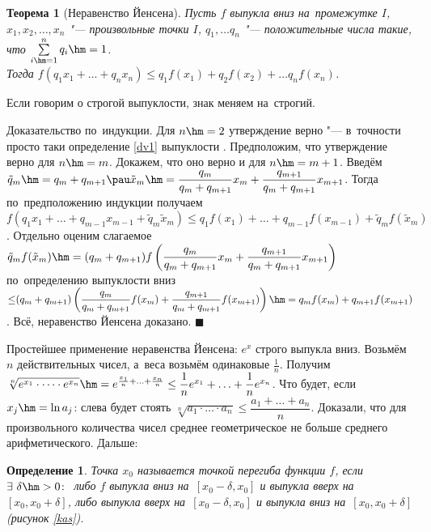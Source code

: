 \documentclass[a4paper,10pt,twoside]{article}
\newtheorem{Def}{Определение}[section]
\newtheorem{The}{Теорема}[section]
\newenvironment{Proof}
       {\par\noindent{\textbf{Доказательство.}}}
       {\hfill$\scriptstyle\blacksquare$}
\begin{document}
\begin{The}[Неравенство Йенсена]
    Пусть $f$ выпукла вниз на~промежутке $I$, $x_1,x_2,\ldots,x_n$ "--- произвольные точки $I$, $q_1,\ldots q_n$ "--- положительные числа такие, что
    $\sum\limits_{i\hm=1}^nq_i\hm=1$. \\Тогда $f(q_1x_1+\ldots+q_nx_n)\leq q_1f(x_1)+q_2f(x_2)+\ldots q_nf(x_n)$.
\end{The}

Если говорим о строгой выпуклости, знак меняем на~строгий.

\begin{Proof}
    Доказательство по~индукции. Для $n\hm=2$ утверждение верно "--- в~точности просто таки определение \ref{dv1} выпуклости . Предположим, что утверждение верно для $n\hm=m$.
    Докажем, что оно верно и для $n\hm=m+1$. Введём $\tilde q_m\hm=q_m+q_{m+1}\pau \tilde x_m\hm=\dfrac{q_m}{q_m+q_{m+1}}x_m+\dfrac{q_{m+1}}{q_m+q_{m+1}}x_{m+1}$.
    Тогда по~предположению индукции получаем $f(q_1x_1+\ldots+q_{m-1}x_{m-1}+\tilde q_m\tilde x_m)\leq q_1f(x_1)+\ldots+q_{m-1}f(x_{m-1})+\tilde q_mf(\tilde x_m)$.
    Отдельно оценим слагаемое $\tilde q_mf(\tilde x_m)\hm=(q_m+q_{m+1})f\left(\dfrac{q_m}{q_m+q_{m+1}}x_m+\dfrac{q_{m+1}}{q_m+q_{m+1}}x_{m+1}\right)$ по~определению
    выпуклости вниз ${\leq} (q_m+q_{m+1})\left(\dfrac{q_m}{q_m+q_{m+1}}f(x_m)+\dfrac{q_{m+1}}{q_m+q_{m+1}}f(x_{m+1})\right)\hm=q_mf(x_m)+q_{m+1}f(x_{m+1})$.
    Всё, неравенство Йенсена доказано.
\end{Proof}

Простейшее применение неравенства Йенсена: $e^x$ строго выпукла вниз. Возьмём $n$ действительных чисел, а~веса возьмём одинаковые $\frac1n$. Получим
$\sqrt[n]{e^{x_1}\cdot\dots\cdot e^{x_n}}\hm=e^{\frac{x_1}{n}+\ldots+\frac{x_n}{n}}\leq\dfrac1ne^{x_1}+\ldots+\dfrac1ne^{x_n}$. Что будет, если $x_j\hm=\ln a_j$:
слева будет стоять $\sqrt[n]{a_1\cdot\dots\cdot a_n}\leq\dfrac{a_1+\ldots+a_n}n$. Доказали, что для произвольного количества чисел среднее геометрическое не больше среднего арифметического. Дальше:

\begin{Def}

   Точка $x_0$ называется точкой перегиба функции $f$, если $\exists\  \delta\hm>0\colon$ либо $f$ выпукла вниз на~$[x_0-\delta,x_0]$ и выпукла вверх на~$[x_0,x_0+\delta]$,
    либо выпукла вверх на~$[x_0-\delta,x_0]$ и выпукла вниз на~$[x_0,x_0+\delta]$ (рисунок \ref{kas}).

\end{Def}
\end{document}
